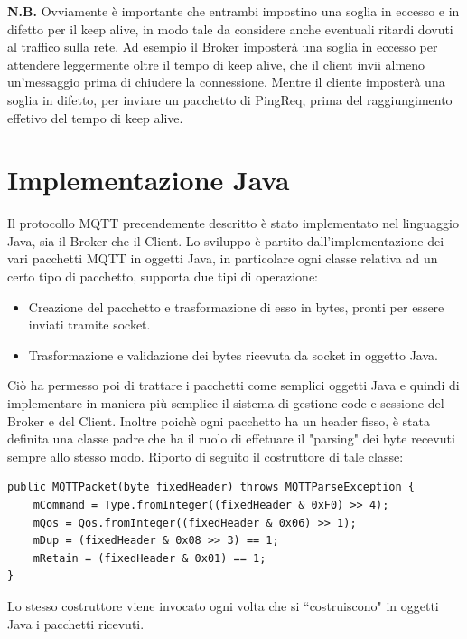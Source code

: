 \documentclass{article}
\begin{document}
\textbf{N.B.} Ovviamente è importante che entrambi impostino una soglia in eccesso e in difetto per il keep alive, in modo tale da considere anche eventuali ritardi dovuti al traffico sulla rete. Ad esempio il Broker imposterà una soglia in eccesso per attendere leggermente oltre il tempo di keep alive, che il client invii almeno un'messaggio prima di chiudere la connessione. Mentre il cliente imposterà una soglia in difetto, per inviare un pacchetto di PingReq, prima del raggiungimento effetivo del tempo di keep alive.


\section{Implementazione Java}
Il protocollo MQTT precendemente descritto è stato implementato nel linguaggio Java, sia il Broker che il Client. Lo sviluppo è partito dall'implementazione dei vari pacchetti MQTT in oggetti Java, in particolare ogni classe relativa ad un certo tipo di pacchetto, supporta due tipi di operazione:
\begin{itemize}
	\item Creazione del pacchetto e trasformazione di esso in bytes, pronti per essere inviati tramite socket.
	\item Trasformazione e validazione dei bytes ricevuta da socket in oggetto Java.
\end{itemize}
Ciò ha permesso poi di trattare i pacchetti come semplici oggetti Java e quindi di implementare in maniera più semplice il sistema di gestione code e sessione del Broker e del Client. Inoltre poichè ogni pacchetto ha un header fisso, è stata definita una classe padre che ha il ruolo di effetuare il "parsing" dei byte recevuti sempre allo stesso modo. Riporto di seguito il costruttore di tale classe:
\begin{lstlisting}
public MQTTPacket(byte fixedHeader) throws MQTTParseException {
	mCommand = Type.fromInteger((fixedHeader & 0xF0) >> 4);
	mQos = Qos.fromInteger((fixedHeader & 0x06) >> 1);
	mDup = (fixedHeader & 0x08 >> 3) == 1;
	mRetain = (fixedHeader & 0x01) == 1;
}
\end{lstlisting}
Lo stesso costruttore viene invocato ogni volta che si ``costruiscono" in oggetti Java i pacchetti ricevuti.
\end{document}
